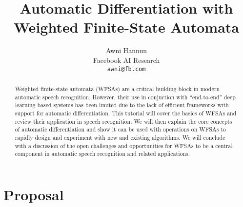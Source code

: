\documentclass[11pt]{article}
\title{Automatic Differentiation with Weighted Finite-State Automata}
\author{
  Awni Hannun\\
  Facebook AI Research \\
  \texttt{awni@fb.com}
}
\begin{document}
\maketitle

\begin{abstract}
  Weighted finite-state automata (WFSAs) are a critical building block in
  modern automatic speech recognition. However, their use in conjuction with
  ``end-to-end'' deep learning based systems has been limited due to the lack
  of efficient frameworks with support for automatic differentiation. This
  tutorial will cover the basics of WFSAs and review their application in
  speech recognition. We will then explain the core concepts of automatic
  differentiation and show it can be used with operations on WFSAs to rapidly
  design and experiment with new and existing algorithms. We will conclude with
  a discussion of the open challenges and opportunities for WFSAs to be a
  central component in automatic speech recognition and related applications.
\end{abstract}

\section*{Proposal}
\end{document}
